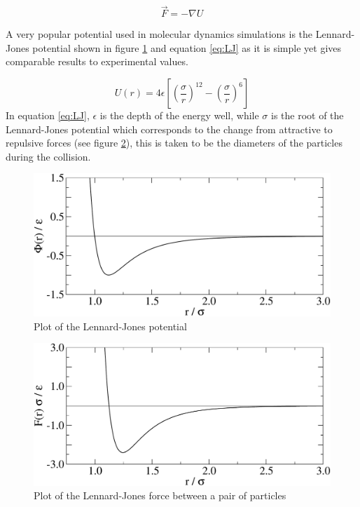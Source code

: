 \documentclass[12pt]{UoAthesis}
\begin{document}
\begin{equation} 
\vec{F}=-\nabla U 
\label{eq:forcePotential} 
\end{equation}

A very popular potential used in molecular dynamics simulations is the
Lennard-Jones potential \cite{Lennard-Jones1924} shown in figure
\ref{fig:ljPot} and equation \ref{eq:LJ} as it is simple yet gives
comparable results to experimental values.

\begin{equation} 
  U(r) = 4 \epsilon \left[ \left( \frac{\sigma}{r} \right)^{12}
    -\left( \frac{\sigma}{r} \right)^{6} \right] 
  \label{eq:LJ} 
\end{equation}
In equation \ref{eq:LJ}, $\epsilon$ is the depth of the energy well,
while $\sigma$ is the root of the Lennard-Jones potential which
corresponds to the change from attractive to repulsive forces (see
figure \ref{fig:ljForce}), this is taken to be the diameters of the
particles during the collision.

\begin{figure}[htp] 
  \begin{center}
    \includegraphics[clip,width=\textwidth]{figures/ljPlot} 
    \caption{\label{fig:ljPot} Plot of the Lennard-Jones potential} 
  \end{center}
\end{figure}

\begin{figure}[htp] 
  \begin{center}
    \includegraphics[clip,width=\textwidth]{figures/ljForce} 
    \caption{\label{fig:ljForce} Plot of the Lennard-Jones force between
      a pair of particles}
  \end{center}
\end{figure}
\end{document}
